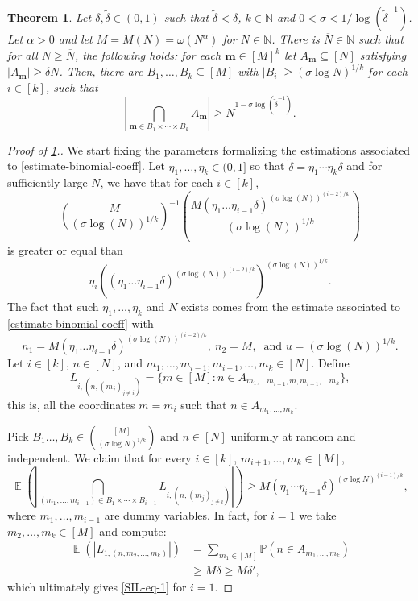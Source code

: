 \documentclass[10pt,a4paper]{amsart}
\newtheorem{theorem}{Theorem}
\newcommand{\E}{\operatorname{\mathbb{E}}}
\newcommand{\N}{\mathbb{N}}
\renewcommand{\P}{\mathbb{P}}
\begin{document}
 \begin{theorem}\label{FIL}
      Let $\delta,\tilde{\delta}\in (0,1)$ such that $\tilde{\delta}<\delta$, $k\in \N$ and $0<\sigma<1/\log{(\tilde{\delta}^{-1})}$. Let $\alpha>0$ and let $M=M(N) =\omega(N^\alpha)$ for $N\in \N$. There is $\overline{N}\in \N$ such that for all $N\geq \overline{N}$, the following holds: for each $\boldsymbol{m}\in [M]^{k}$ let $A_{\boldsymbol{m}}\subseteq [N]$ satisfying $|A_{\boldsymbol{m}}|\geq \delta N$. Then, there are $B_1,\ldots,B_{k}\subseteq [M] $ with $|B_i|\geq (\sigma \log{N})^{1/k}$ for each $i\in [k]$, such that 
        $$\left| \bigcap_{\boldsymbol{m}\in B_1\times \cdots \times B_{k}} A_{\boldsymbol{m}} \right| \geq N^{1-\sigma \log(\tilde{\delta}^{-1})}.$$
\end{theorem}

\begin{proof}[Proof of \cref{FIL}.]
We start fixing the parameters formalizing the estimations associated to \cref{estimate-binomial-coeff}. Let $\eta_1,\ldots,\eta_k\in (0,1]$ so that $\tilde{\delta}=\eta_1\cdots\eta_k\delta$ and for sufficiently large $N$, we have that for each $i\in [k]$,
$$     \binom{M}{(\sigma \log(N))^{1/k}}^{-1}\binom{M (\eta_1\ldots\eta_{i-1}\delta)^{(\sigma \log(N))^{(i-2)/k}}}{(\sigma \log(N))^{1/k}}     $$
is greater or equal than
$$ \eta_i \left(  (\eta_1\ldots\eta_{i-1}\delta)^{(\sigma \log(N))^{(i-2)/k}}  \right)^{(\sigma \log(N))^{1/k}}.$$
The fact that such $\eta_1,\ldots,\eta_k$ and $N$ exists comes from the estimate associated to \cref{estimate-binomial-coeff} with $$n_1=M (\eta_1\ldots\eta_{i-1}\delta)^{(\sigma \log(N))^{(i-2)/k}},~n_2=M,~ \text{ and }u=(\sigma \log(N))^{1/k}.$$
Let $i\in [k]$, $n\in[N]$, and $m_1,\ldots,m_{i-1},m_{i+1},\ldots,m_k\in [N]$. Define
    $$L_{i,(n,(m_j)_{j\neq i})}=\{m\in [M] : n\in A_{m_1,\ldots m_{i-1}, m ,m_{i+1}, \ldots m_k}\}, $$
this is, all the coordinates $m=m_i$ such that $n\in A_{m_1,\ldots,m_k}$. 
    
    Pick $B_1\ldots,B_k\in \binom{[M]}{(\sigma \log{N})^{1/k}}$ and $n\in [N]$ uniformly at random and independent. We claim that for every $i\in [k]$, $m_{i+1},\ldots,m_k\in [M]$,
    \begin{equation}\label{SIL-eq-1}
         \E\left( \left| \bigcap_{( m_1,\ldots,m_{i-1})\in  B_1\times \cdots \times B_{i-1} } L_{i,(n,(m_j)_{j\neq i })} \right| \right)\geq M(\eta_1\cdots\eta_{i-1}\delta)^{(\sigma \log{N})^{(i-1)/k}},
    \end{equation}
    where $m_1,\ldots,m_{i-1}$ are dummy variables. In fact, for $i=1$ we take $m_2,\ldots,m_k\in [M]$ and compute:
    \begin{align*}
        \E\left( \left|  L_{1,(n,m_2,\ldots,m_k)} \right| \right)&= \sum_{m_1\in [M]} \P( n \in A_{m_1,\ldots,m_k})\\
        &\geq  M\delta \geq M\delta',
    \end{align*}   
    which ultimately gives \cref{SIL-eq-1} for $i=1$.
    

\end{proof}
\end{document}
